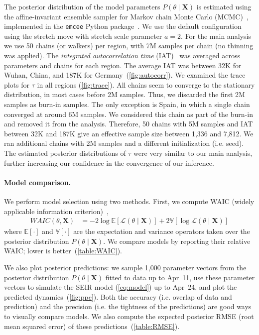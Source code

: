 \documentclass[12pt]{extarticle}
\let\vec\mathbf
\begin{document}
{The posterior distribution of the model parameters $P(\theta \mid \vec{X})$ is estimated using the affine-invariant ensemble sampler for Markov chain Monte Carlo (MCMC)~\citep{Goodman2010}, implemented in the \texttt{emcee} Python package~\citep{Foreman-Mackey2013}.
We use the default configuration using the stretch move with stretch scale parameter $a=2$.
For the main analysis we use 50 chains (or walkers) per region, with 7M samples per chain (no thinning was applied).
The \emph{integrated autocorrelation time} (IAT)~\citep{Foreman-Mackey2013,Goodman2010} was averaged across parameters and chains for each region. 
The average IAT was between 32K for Wuhan, China, and 187K for Germany~(\autoref{fig:autocorr}).
We examined the trace plots for $\tau$ in all regions (\autoref{fig:trace}).
All chains seem to converge to the stationary distribution, in most cases before 2M samples. Thus, we discarded the first 2M samples as burn-in samples.
The only exception is Spain, in which a single chain converged at around 6M samples.
We considered this chain as part of the burn-in and removed it from the analysis.
Therefore, 50 chains with 5M samples and IAT between 32K and 187K give an effective sample size between 1,336 and 7,812.
We ran additional chains with 2M samples and a different initialization (i.e. seed). The estimated posterior distributions of $\tau$ were very similar to our main analysis, further increasing our confidence in the convergence of our inference.



\paragraph*{Model comparison.}
We perform model selection using two methods.
First, we compute WAIC (widely applicable information criterion)~\citep{gelman2013bayesian},
\begin{equation} \label{eq:WAIC}
\begin{aligned}
\mathit{WAIC}(\theta, \vec{X}) &= -2\log\mathbb{E}[\mathcal{L}(\theta \mid \vec{X})] + 2\mathbb{V}[\log\mathcal{L}(\theta \mid \vec{X})]
\end{aligned}
\end{equation}
where $\mathbb{E}[\cdot]$ and $\mathbb{V}[\cdot]$ are the expectation and variance operators taken over the posterior distribution $P(\theta \mid \vec{X})$.
We compare models by reporting their relative WAIC; lower is better~(\autoref{table:WAIC}).

We also plot posterior predictions: we sample 1,000 parameter vectors from the posterior distribution $P(\theta \mid \vec{X})$ fitted to data up to Apr~11, use these parameter vectors to simulate the SEIR model (\autoref{eq:model}) up to Apr~24, and plot the predicted dynamics~(\autoref{fig:ppc}).
Both the accuracy (i.e. overlap of data and prediction) and the precision (i.e. the tightness of the predictions) are good ways to visually compare models.
We also compute the expected posterior RMSE (root mean squared error) of these predictions~(\autoref{table:RMSE}).
} %
\end{document}

